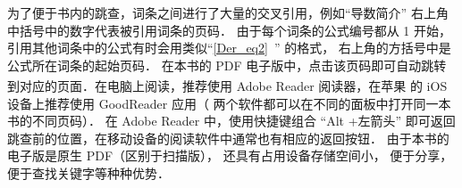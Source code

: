 为了便于书内的跳查，词条之间进行了大量的交叉引用，例如“导数简介” 右上角中括号中的数字代表被引用词条的页码． 由于每个词条的公式编号都从 1 开始， 引用其他词条中的公式有时会用类似“\autoref{Der_eq2}~” 的格式， 右上角的方括号中是公式所在词条的起始页码． 在本书的 PDF 电子版中，点击该页码即可自动跳转到对应的页面．在电脑上阅读，推荐使用 Adobe Reader 阅读器，在苹果\textsuperscript{\textregistered} 的 iOS 设备上推荐使用 GoodReader 应用（ 两个软件都可以在不同的面板中打开同一本书的不同页码）． 在 Adobe Reader 中，使用快捷键组合 “Alt +左箭头” 即可返回跳查前的位置，在移动设备的阅读软件中通常也有相应的返回按钮． 由于本书的电子版是原生 PDF（区别于扫描版）， 还具有占用设备存储空间小， 便于分享， 便于查找关键字等种种优势．



